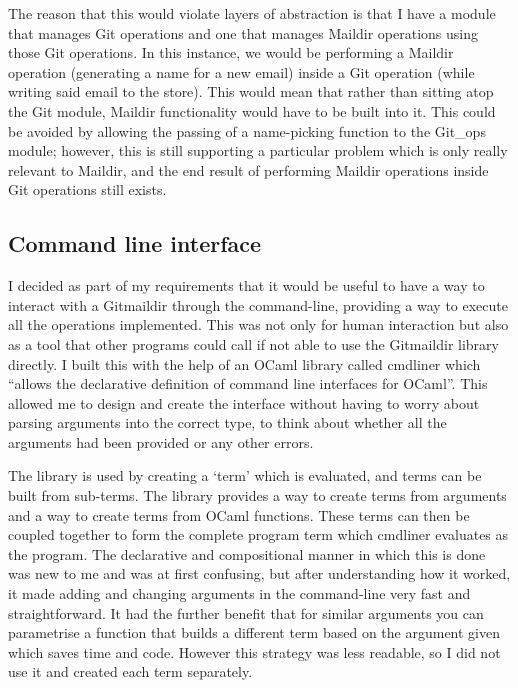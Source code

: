 The reason that this would violate layers of abstraction is that I have a module that manages Git operations and one that manages Maildir operations using those Git operations. In this instance, we would be performing a Maildir operation (generating a name for a new email) inside a Git operation (while writing said email to the store). This would mean that rather than sitting atop the Git module, Maildir functionality would have to be built into it. This could be avoided by allowing the passing of a name-picking function to the Git\_ops module; however, this is still supporting a particular problem which is only really relevant to Maildir, and the end result of performing Maildir operations inside Git operations still exists.

\subsection{Command line interface}

I decided as part of my requirements that it would be useful to have a way to interact with a Gitmaildir through the command-line, providing a way to execute all the operations implemented. This was not only for human interaction but also as a tool that other programs could call if not able to use the Gitmaildir library directly. I built this with the help of an OCaml library called cmdliner which ``allows the declarative definition of command line interfaces for OCaml''\cite{code_cmdliner}. This allowed me to design and create the interface without having to worry about parsing arguments into the correct type, to think about whether all the arguments had been provided or any other errors.

The library is used by creating a `term' which is evaluated, and terms can be built from sub-terms. The library provides a way to create terms from arguments and a way to create terms from OCaml functions. These terms can then be coupled together to form the complete program term which cmdliner evaluates as the program. The declarative and compositional manner in which this is done was new to me and was at first confusing, but after understanding how it worked, it made adding and changing arguments in the command-line very fast and straightforward. It had the further benefit that for similar arguments you can parametrise a function that builds a different term based on the argument given which saves time and code. However this strategy was less readable, so I did not use it and created each term separately.

